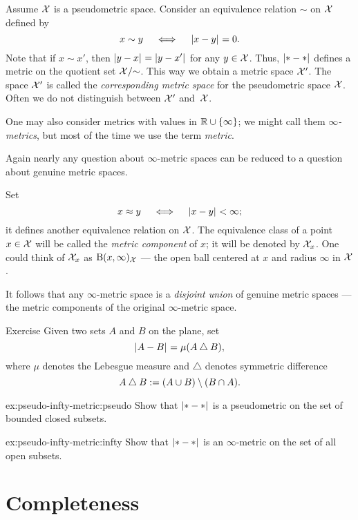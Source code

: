 Assume $\mathcal{X}$ is a pseudometric space.
Consider an equivalence relation $\sim$ on $\mathcal{X}$ defined by
\[x\sim y\quad\iff\quad\dist{x}{y}{}=0.\] 
Note that if $x\sim x'$, then $\dist{y}{x}{}=\dist{y}{x'}{}$ for any $y\in\mathcal{X}$.
Thus, $\dist{*}{*}{}$ defines a metric on the
quotient set $\mathcal{X}/{\sim}$.
This way we obtain a metric space $\mathcal{X}'$.
The space $\mathcal{X}'$ is called the 
\emph{corresponding metric space} for the pseudometric space $\mathcal{X}$.
Often we do not distinguish between $\mathcal{X}'$ and~$\mathcal{X}$. 

One may also consider metrics with values in $\mathbb{R}\cup\{\infty\}$;
we might call them \emph{$\infty$-metrics}, but most of the time we use the term {}\emph{metric}.

Again nearly any question about $\infty$-metric spaces can be reduced to a question about genuine metric spaces. 

Set 
\[x\approx y\quad\iff\quad\dist{x}{y}{}<\infty;\]
it defines another equivalence relation on $\mathcal{X}$.
The equivalence class of a point $x\in\mathcal{X}$ will be called the \emph{metric component} 
 of $x$; it will be denoted by $\mathcal{X}_x$.
One could think of $\mathcal{X}_x$ as  $\mathrm{B}{}(x,\infty)_{\mathcal{X}}$ --- the open ball centered at $x$ and radius $\infty$ in $\mathcal{X}$.

It follows that any $\infty$-metric space is a {}\emph{disjoint union} of genuine metric spaces --- the metric components of the original $\infty$-metric space.

\begin{thm}{Exercise}\label{ex:pseudo-infty-metric}
Given two sets $A$ and $B$ on the plane, set 
\[\dist{A}{B}{}=\mu(A\bigtriangleup B),\]
where $\mu$ denotes the Lebesgue measure and $\bigtriangleup$ denotes symmetric difference
\[A\bigtriangleup B\mathrel{:=}(A\cup B)\setminus(B\cap A).\]

\begin{subthm}{ex:pseudo-infty-metric:pseudo}
Show that $\dist{*}{*}{}$ is a pseudometric on the set of bounded closed subsets.
\end{subthm}

\begin{subthm}{ex:pseudo-infty-metric:infty}
Show that $\dist{*}{*}{}$ is an $\infty$-metric on the set of all open subsets.
\end{subthm}
\end{thm}

\section{Completeness}


